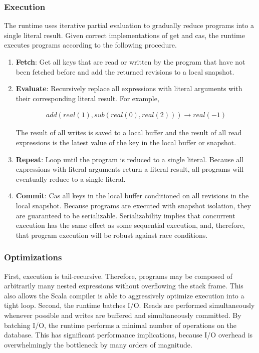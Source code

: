 \documentclass[../main.tex]{subfiles}
\begin{document}
    \subsubsection{Execution}
    The runtime uses iterative partial evaluation to gradually reduce programs into a single literal
    result. Given correct implementations of get and cas, the runtime executes programs according to
    the following procedure.

    \begin{enumerate}
      \item \textbf{Fetch}: Get all keys that are read or written by the program that have not been
            fetched before and add the returned revisions to a local snapshot.
      \item \textbf{Evaluate}: Recursively replace all expressions with literal arguments with their
            corresponding literal result. For example,

            \[
            \begin{gathered}
            add(real(1), sub(real(0), real(2))) \rightarrow real(-1)
            \end{gathered}
            \]

            The result of all writes is saved to a local buffer and the result of all read
            expressions is the latest value of the key in the local buffer or snapshot.
      \item \textbf{Repeat}: Loop until the program is reduced to a single literal. Because all
            expressions with literal arguments return a literal result, all programs will eventually
            reduce to a single literal.
      \item \textbf{Commit}: Cas all keys in the local buffer conditioned on all revisions in
            the local snapshot. Because programs are executed with snapshot isolation, they are
            guaranteed to be serializable. Serializability implies that concurrent execution has the
            same effect as some sequential execution, and, therefore, that program execution will be
            robust against race conditions.
    \end{enumerate}

    \subsubsection{Optimizations}
    First, execution is tail-recursive. Therefore, programs may be composed of arbitrarily many
    nested expressions without overflowing the stack frame. This also allows the Scala compiler is
    able to aggressively optimize execution into a tight loop. Second, the runtime batches I/O.
    Reads are performed simultaneously whenever possible and writes are buffered and simultaneously
    committed. By batching I/O, the runtime performs a minimal number of operations on the database.
    This has significant performance implications, because I/O overhead is overwhelmingly the
    bottleneck by many orders of magnitude.~\cite{io}
\end{document}
